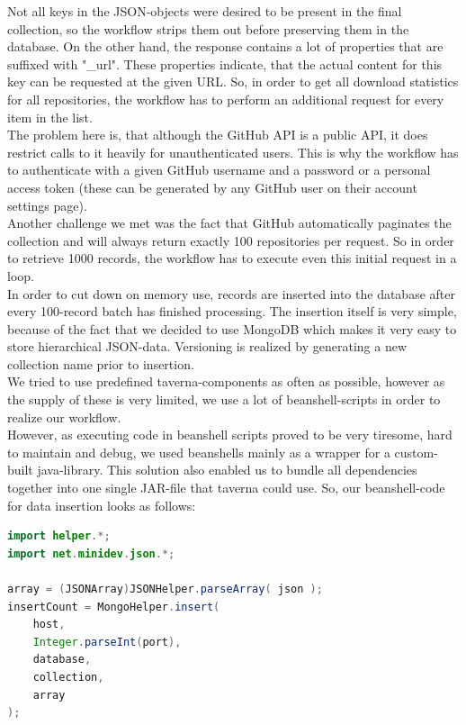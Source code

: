 Not all keys in the JSON-objects were desired to be present in the final
collection, so the workflow strips them out before preserving them in the
database. On the other hand, the response contains a lot of properties that are
suffixed with "\_url". These properties indicate, that the actual content for
this key can be requested at the given URL. So, in order to get all
download statistics for all repositories, the workflow has to perform an
additional request for every item in the list.\\

The problem here is, that although the GitHub API is a public API, it does
restrict calls to it heavily for unauthenticated users. This is why the workflow
has to authenticate with a given GitHub username and a password or a personal
access token (these can be generated by any GitHub user on their account
settings page).\\

Another challenge we met was the fact that GitHub automatically paginates the
collection and will always return exactly 100 repositories per request. So in
order to retrieve 1000 records, the workflow has to execute even this initial
request in a loop.\\

In order to cut down on memory use, records are inserted into the database after
every 100-record batch has finished processing. The insertion itself is very
simple, because of the fact that we decided to use MongoDB which makes it very
easy to store hierarchical JSON-data. Versioning is realized by generating a new
collection name prior to insertion.\\

We tried to use predefined taverna-components as often as possible, however as
the supply of these is very limited, we use a lot of beanshell-scripts in order
to realize our workflow. \\

However, as executing code in beanshell scripts proved to be very tiresome, hard to
maintain and debug, we used beanshells mainly as a wrapper for a custom-built
java-library. This solution also enabled us to bundle all dependencies together
into one single JAR-file that taverna could use. So, our beanshell-code for data
insertion looks as follows:

\begin{lstlisting}[language=Java]
import helper.*;
import net.minidev.json.*;

array = (JSONArray)JSONHelper.parseArray( json );
insertCount = MongoHelper.insert(
	host,
	Integer.parseInt(port),
	database,
	collection,
	array
);
\end{lstlisting}

